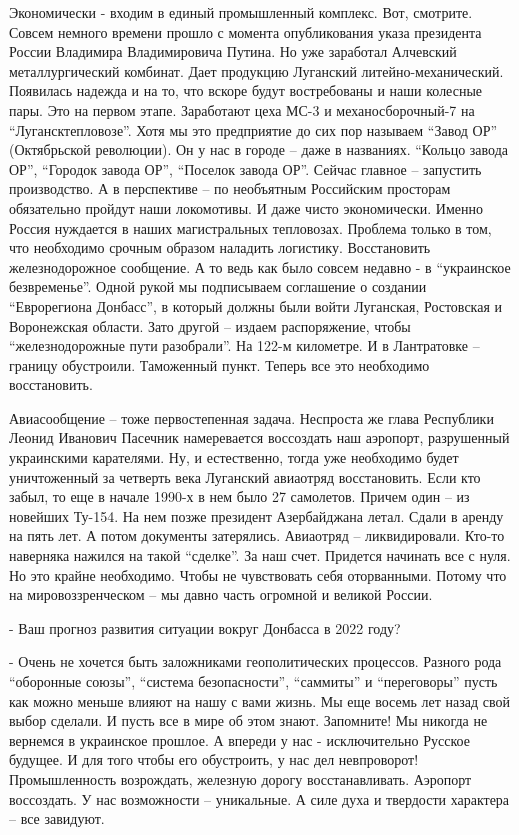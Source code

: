 Экономически - входим в единый промышленный комплекс. Вот, смотрите. Совсем
немного времени прошло с момента опубликования указа президента России
Владимира Владимировича Путина. Но уже заработал Алчевский металлургический
комбинат. Дает продукцию Луганский литейно-механический. Появилась надежда и на
то, что вскоре будут востребованы и наши колесные пары. Это на первом этапе.
Заработают цеха МС-3 и механосборочный-7 на \enquote{Лугансктепловозе}. Хотя мы это
предприятие до сих пор называем \enquote{Завод ОР} (Октябрьской революции). Он у нас в
городе – даже в названиях. \enquote{Кольцо завода ОР}, \enquote{Городок завода ОР}, \enquote{Поселок
завода ОР}. Сейчас главное – запустить производство. А в перспективе – по
необъятным Российским просторам обязательно пройдут наши локомотивы. И даже
чисто экономически. Именно Россия нуждается в наших магистральных тепловозах.
Проблема только в том, что необходимо срочным образом наладить логистику.
Восстановить железнодорожное сообщение. А то ведь как было совсем недавно - в
\enquote{украинское безвременье}. Одной рукой мы подписываем соглашение о создании
\enquote{Еврорегиона Донбасс}, в который должны были войти Луганская, Ростовская и
Воронежская области. Зато другой – издаем распоряжение, чтобы \enquote{железнодорожные
пути разобрали}. На 122-м километре. И в Лантратовке – границу обустроили.
Таможенный пункт. Теперь все это необходимо восстановить.

Авиасообщение – тоже первостепенная задача. Неспроста же глава Республики
Леонид Иванович Пасечник намеревается воссоздать наш аэропорт, разрушенный
украинскими карателями. Ну, и естественно, тогда уже необходимо будет
уничтоженный за четверть века Луганский авиаотряд восстановить. Если кто забыл,
то еще в начале 1990-х в нем было 27 самолетов. Причем один – из новейших
Ту-154. На нем позже президент Азербайджана летал. Сдали в аренду на пять лет.
А потом документы затерялись. Авиаотряд – ликвидировали. Кто-то наверняка
нажился на такой \enquote{сделке}. За наш счет. Придется начинать все с нуля. Но это
крайне необходимо. Чтобы не чувствовать себя оторванными. Потому что на
мировоззренческом – мы давно часть огромной и великой России.

- Ваш прогноз развития ситуации вокруг Донбасса в 2022 году?

- Очень не хочется быть заложниками геополитических процессов. Разного рода
\enquote{оборонные союзы}, \enquote{система безопасности}, \enquote{саммиты} и \enquote{переговоры} пусть как
можно меньше влияют на нашу с вами жизнь. Мы еще восемь лет назад свой выбор
сделали. И пусть все в мире об этом знают. Запомните! Мы никогда не вернемся в
украинское прошлое. А впереди у нас - исключительно Русское будущее. И для того
чтобы его обустроить, у нас дел невпроворот! Промышленность возрождать,
железную дорогу восстанавливать. Аэропорт воссоздать. У нас возможности –
уникальные. А силе духа и твердости характера – все завидуют.

